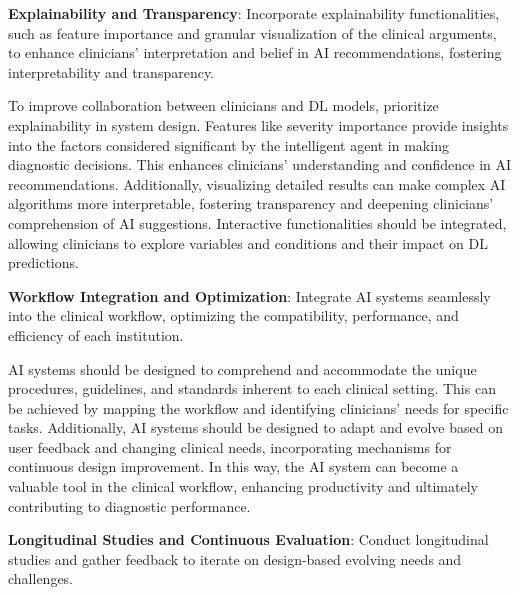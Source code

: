 \vspace{2.00mm}

\noindent
{\bf Explainability and Transparency}:
Incorporate explainability functionalities, such as feature importance and granular visualization of the clinical arguments, to enhance clinicians' interpretation and belief in \ac{AI} recommendations, fostering interpretability and transparency.

\vspace{2.00mm}

To improve collaboration between clinicians and \ac{DL} models, prioritize explainability in system design.
Features like severity importance provide insights into the factors considered significant by the intelligent agent in making diagnostic decisions.
This enhances clinicians' understanding and confidence in \ac{AI} recommendations.
Additionally, visualizing detailed results can make complex \ac{AI} algorithms more interpretable, fostering transparency and deepening clinicians' comprehension of \ac{AI} suggestions.
Interactive functionalities should be integrated, allowing clinicians to explore variables and conditions and their impact on \ac{DL} predictions.

\vspace{2.00mm}

\noindent
{\bf Workflow Integration and Optimization}:
Integrate \ac{AI} systems seamlessly into the clinical workflow, optimizing the compatibility, performance, and efficiency of each institution.

\vspace{2.00mm}

\ac{AI} systems should be designed to comprehend and accommodate the unique procedures, guidelines, and standards inherent to each clinical setting.
This can be achieved by mapping the workflow and identifying clinicians' needs for specific tasks.
Additionally, \ac{AI} systems should be designed to adapt and evolve based on user feedback and changing clinical needs, incorporating mechanisms for continuous design improvement.
In this way, the \ac{AI} system can become a valuable tool in the clinical workflow, enhancing productivity and ultimately contributing to diagnostic performance.

\vspace{2.00mm}

\noindent
{\bf Longitudinal Studies and Continuous Evaluation}:
Conduct longitudinal studies and gather feedback to iterate on design-based evolving needs and challenges.

